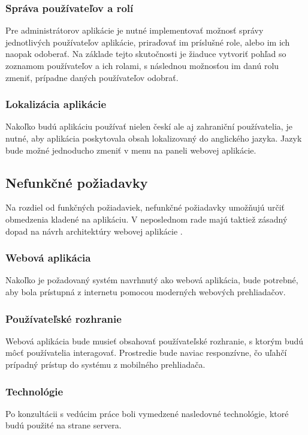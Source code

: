 \subsubsection{Správa používateľov a rolí}\label{sprava-pouzivatelov-a-roli}
Pre administrátorov aplikácie je nutné implementovať možnosť správy jednotlivých používateľov aplikácie, priraďovať im príslušné role, alebo im ich naopak odoberať. Na základe tejto skutočnosti je žiaduce vytvoriť pohľad so zoznamom používateľov a ich rolami, s následnou možnosťou im danú rolu zmeniť, prípadne daných používateľov odobrať.

\subsubsection{Lokalizácia aplikácie}
Nakoľko budú aplikáciu používať nielen českí ale aj zahraniční používatelia, je nutné, aby aplikácia poskytovala obsah lokalizovaný do anglického jazyka. Jazyk bude možné jednoducho zmeniť v menu na paneli webovej aplikácie.

\subsection{Nefunkčné požiadavky}
Na rozdiel od funkčných požiadaviek, nefunkčné požiadavky umožňujú určiť obmedzenia kladené na aplikáciu. V neposlednom rade majú taktiež zásadný dopad na návrh architektúry webovej aplikácie \cite{co-su-pripady-pouzitia}.

\subsubsection{Webová aplikácia}
Nakoľko je požadovaný systém navrhnutý ako webová aplikácia, bude potrebné, aby bola prístupná z internetu pomocou moderných webových prehliadačov.

\subsubsection{Používateľské rozhranie}
Webová aplikácia bude musieť obsahovať používateľské rozhranie, s ktorým budú môcť používatelia interagovať.
Prostredie bude naviac responzívne, čo uľahčí prípadný prístup do systému z mobilného prehliadača.

\subsubsection{Technológie}
Po konzultácii s vedúcim práce boli vymedzené nasledovné technológie, ktoré budú použité na strane servera.

